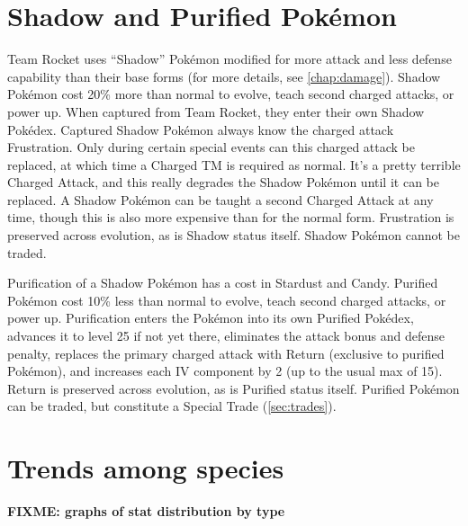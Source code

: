 \section{Shadow and Purified Pokémon}
Team Rocket uses ``Shadow'' Pokémon modified for more attack
 and less defense capability than their base forms (for more details,
 see \autoref{chap:damage}).
Shadow Pokémon cost 20\% more than normal to evolve, teach second charged attacks, or power up.
When captured from Team Rocket, they enter their own Shadow Pokédex.
Captured Shadow Pokémon always know the charged attack Frustration.
Only during certain special events can this charged attack be replaced,
 at which time a Charged TM is required as normal.
It's a pretty terrible Charged Attack, and this really degrades the
 Shadow Pokémon until it can be replaced.
A Shadow Pokémon can be taught a second Charged Attack at any
 time, though this is also more expensive than for the normal form.
Frustration is preserved across evolution, as is Shadow status itself.
Shadow Pokémon cannot be traded.

Purification of a Shadow Pokémon has a cost in Stardust and Candy.
Purified Pokémon cost 10\% less than normal to evolve, teach second charged attacks, or power up.
Purification enters the Pokémon into its own Purified Pokédex,
 advances it to level 25 if not yet there,
 eliminates the attack bonus and defense penalty,
 replaces the primary charged attack with Return (exclusive to purified Pokémon),
 and increases each IV component by 2  (up to the usual max of 15).
Return is preserved across evolution, as is Purified status itself.
Purified Pokémon can be traded, but constitute a Special Trade (\autoref{sec:trades}).

\section{Trends among species}
\textbf{FIXME: graphs of stat distribution by type}
